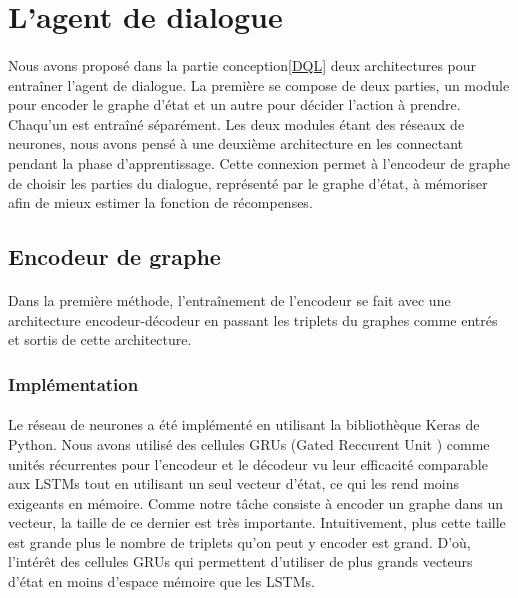 \section{L'agent de dialogue}\label{DMReal}
\paragraph{}Nous avons proposé dans la partie conception\ref{DQL} deux architectures pour entraîner l'agent de dialogue. La première se compose de deux parties, un module pour encoder le graphe d'état et un autre pour décider l'action à prendre. Chaqu'un est entraîné séparément. Les deux modules étant des réseaux de neurones, nous avons pensé à une deuxième architecture en les connectant pendant la phase d'apprentissage. Cette connexion permet à l'encodeur de graphe de choisir les parties du dialogue, représenté par le graphe d'état, à mémoriser afin de mieux estimer la fonction de récompenses.
\subsection{Encodeur de graphe}
\paragraph{}Dans la première méthode, l'entraînement de l'encodeur se fait avec une architecture encodeur-décodeur en passant les triplets du graphes comme entrés et sortis de cette architecture.
\subsubsection{Implémentation}
\paragraph{}Le réseau de neurones a été implémenté en utilisant la bibliothèque Keras de Python. Nous avons utilisé des cellules GRUs (Gated Reccurent Unit \cite{Cho2014}) comme unités récurrentes pour l'encodeur et le décodeur vu leur efficacité comparable aux LSTMs tout en utilisant un seul vecteur d'état, ce qui les rend moins exigeants en mémoire. Comme notre tâche consiste à encoder un graphe dans un vecteur, la taille de ce dernier est très importante. Intuitivement, plus cette taille est grande plus le nombre de triplets qu'on peut y encoder est grand. D'où, l'intérêt des cellules GRUs qui permettent d'utiliser de plus grands vecteurs d'état en moins d'espace mémoire que les LSTMs.
